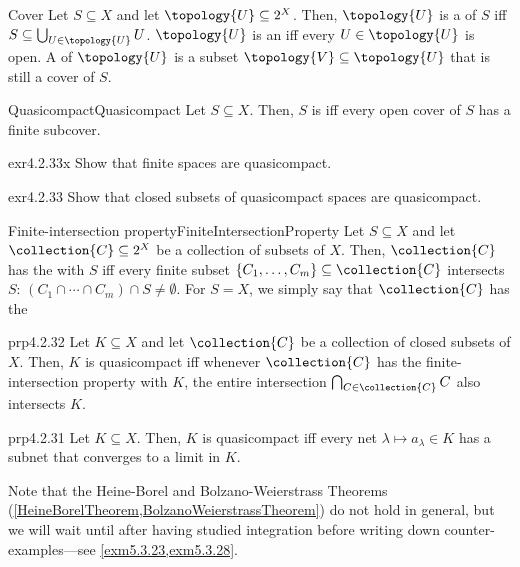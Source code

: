 \begin{dfn}{Cover}{}
Let $S\subseteq X$ and let $\topology{U}\subseteq 2^{X}$.  Then, $\topology{U}$ is a  of $S$ iff $S\subseteq \bigcup _{U\in \topology{U}}U$.  $\topology{U}$ is an  iff every $U\in \topology{U}$ is open.  A  of $\topology{U}$ is a subset $\topology{V}\subseteq \topology{U}$ that is still a cover of $S$.
\end{dfn}
\begin{dfn}{Quasicompact}{Quasicompact}
Let $S\subseteq X$.  Then, $S$ is  iff every open cover of $S$ has a finite subcover.
\end{dfn}
\begin{exr}{}{exr4.2.33x}
Show that finite spaces are quasicompact.
\end{exr}
\begin{exr}{}{exr4.2.33}
Show that closed subsets of quasicompact spaces are quasicompact.
\end{exr}
\begin{dfn}{Finite-intersection property}{FiniteIntersectionProperty}
Let $S\subseteq X$ and let $\collection{C}\subseteq 2^X$ be a collection of subsets of $X$.  Then, $\collection{C}$ has the  with $S$ iff every finite subset $\{ C_1,\ldots ,C_m\} \subseteq \collection{C}$ intersects $S$:  $(C_1\cap \cdots \cap C_m)\cap S\neq \emptyset$.  For $S=X$, we simply say that $\collection{C}$ has the 
\end{dfn}
\begin{prp}{}{prp4.2.32}
Let $K\subseteq X$ and let $\collection{C}$ be a collection of closed subsets of $X$.  Then, $K$ is quasicompact iff whenever $\collection{C}$ has the finite-intersection property with $K$, the entire intersection $\bigcap _{C\in \collection{C}}C$ also intersects $K$.
\end{prp}
\begin{prp}{}{prp4.2.31}
Let $K\subseteq X$.  Then, $K$ is quasicompact iff every net $\lambda \mapsto a_\lambda \in K$ has a subnet that converges to a limit in $K$.
\end{prp}
Note that the Heine-Borel and Bolzano-Weierstrass Theorems (\cref{HeineBorelTheorem,BolzanoWeierstrassTheorem}) do not hold in general, but we will wait until after having studied integration before writing down counter-examples---see \cref{exm5.3.23,exm5.3.28}.

